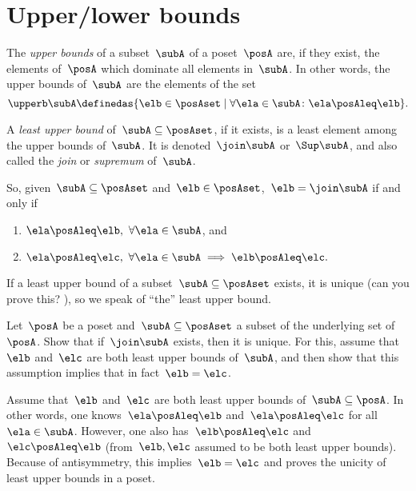 \section{Upper/lower bounds}
\begin{ctdefinition}
	\label{def:least-upper-bound}
	The \emph{upper bounds} of a subset~$\subA$ of a poset~$\posA$ are, if they exist, the elements of~$\posA$ which dominate all elements in~$\subA$.
	In other words, the upper bounds of~$\subA$ are the elements of the set
	\begin{equation*}
		\upperb \subA\definedas \{ \elb \in \posAset \mid \forall \ela \in \subA  \colon \ela \posAleq \elb \}.
	\end{equation*}
\end{ctdefinition}

\begin{ctdefinition}
	A \emph{least upper bound} of~$\subA \subseteq \posAset$, if it exists, is a least element among the upper bounds of~$\subA$.
	It is denoted~$\join \subA$ or~$\Sup\subA$, and also called the \emph{join} or \emph{supremum} of~$\subA$.
\end{ctdefinition}

So, given~$\subA \subseteq \posAset$ and~$\elb \in \posAset$,~$\elb =  \join \subA$ if and only if
\begin{enumerate}
	\item $\ela \posAleq \elb, \ \forall \ela \in \subA$, and
	\item $\ela \posAleq \elc, \ \forall \ela \in \subA \implies \elb \posAleq \elc.
	      $
\end{enumerate}

If a least upper bound of a subset~$\subA \subseteq \posAset$ exists, it is unique (can you prove this?
), so we speak of ``the'' least upper bound.

\begin{exercise}
	Let~$\posA$ be a poset and~$\subA \subseteq \posAset$ a subset of the underlying set of~$\posA$.
	Show that if~$\join \subA$ exists, then it is unique.
	For this, assume that~$\elb$ and~$\elc$ are both least upper bounds of~$\subA$, and then show that this assumption implies that in fact~$\elb = \elc$.
\end{exercise}
\begin{solution}
	Assume that~$\elb$ and~$\elc$ are both least upper bounds of~$\subA \subseteq \posA$.
	In other words, one knows~$\ela \posAleq \elb$ and~$\ela\posAleq \elc$ for all~$\ela\in \subA$.
	However, one also has~$\elb\posAleq \elc$ and~$\elc\posAleq \elb$ (from~$\elb,\elc$ assumed to be both least upper bounds).
	Because of antisymmetry, this implies~$\elb=\elc$ and proves the unicity of least upper bounds in a poset.
\end{solution}

